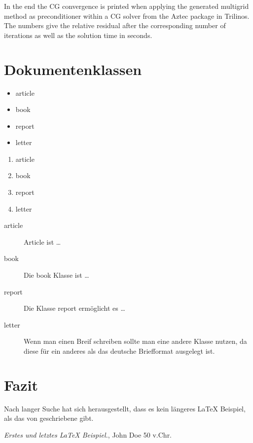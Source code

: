 \documentclass{article}
\begin{document}
In the end the CG convergence is printed when applying the generated multigrid method as preconditioner within a CG solver from the Aztec package in Trilinos.
The numbers give the relative residual after the corresponding number of iterations as well as the solution time in seconds.
\small

\normalsize


\section{Dokumentenklassen} \label{documentclasses}

\begin{itemize}
\item article
\item book 
\item report 
\item letter 
\end{itemize}


\begin{enumerate}
\item article
\item book 
\item report 
\item letter 
\end{enumerate}

\begin{description}
\item[article\label{article}]{Article ist \ldots}
\item[book\label{book}]{Die book Klasse ist \ldots}
\item[report\label{report}]{Die Klasse report erm\"oglicht es  \ldots}
\item[letter\label{letter}]{Wenn man einen Breif schreiben sollte man eine 
	andere Klasse nutzen, da diese f\"ur ein anderes als das deutsche 
	Briefformat ausgelegt ist.}
\end{description}


\section{Fazit}\label{conclusions}
Nach langer Suche hat sich herausgestellt, dass es kein l\"angeres 
\LaTeX{} Beispiel, als das von \cite{doe} geschriebene gibt. 

\begin{thebibliography}{9}
 \emph{Erstes und letztes \LaTeX{} Beispiel.},
John Doe 50 v.Chr.  
\end{thebibliography}
\end{document}
